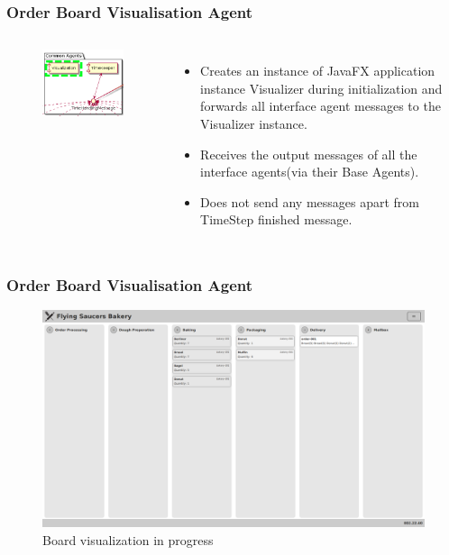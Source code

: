 \documentclass{beamer}
\begin{document}
\begin{frame}
    \frametitle{\huge{Order Board Visualisation Agent}}
    \begin{columns}[t]
        \begin{figure}[H]
            \centering
            \includegraphics[width=0.75\linewidth]{common_Visualization.png}
        \end{figure}
            \begin{itemize}
                \item Creates an instance of JavaFX application instance Visualizer during initialization and forwards all interface agent messages to the Visualizer instance.
                \item Receives the output messages of all the
interface agents(via their Base Agents).
                \item Does not send any messages apart from TimeStep finished message.
            \end{itemize}
    \end{columns}
\end{frame}

\begin{frame}
    \frametitle{\huge{Order Board Visualisation Agent}}
    \begin{figure}[H]
            \centering
            \includegraphics[width=0.99\linewidth]{visualizer-ui.png}
            \caption{Board visualization in progress}
        \end{figure}
\end{frame}
\end{document}
